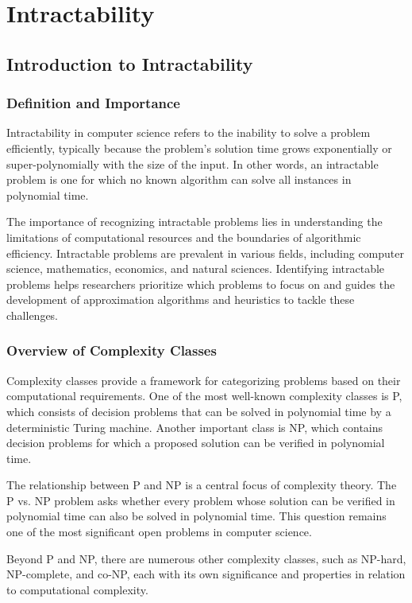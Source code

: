\documentclass[12pt]{book} %
\begin{document}
\chapter{Intractability}

\section{Introduction to Intractability}

\subsection{Definition and Importance}
Intractability in computer science refers to the inability to solve a problem efficiently, typically because the problem's solution time grows exponentially or super-polynomially with the size of the input. In other words, an intractable problem is one for which no known algorithm can solve all instances in polynomial time.

The importance of recognizing intractable problems lies in understanding the limitations of computational resources and the boundaries of algorithmic efficiency. Intractable problems are prevalent in various fields, including computer science, mathematics, economics, and natural sciences. Identifying intractable problems helps researchers prioritize which problems to focus on and guides the development of approximation algorithms and heuristics to tackle these challenges.

\subsection{Overview of Complexity Classes}
Complexity classes provide a framework for categorizing problems based on their computational requirements. One of the most well-known complexity classes is P, which consists of decision problems that can be solved in polynomial time by a deterministic Turing machine. Another important class is NP, which contains decision problems for which a proposed solution can be verified in polynomial time.

The relationship between P and NP is a central focus of complexity theory. The P vs. NP problem asks whether every problem whose solution can be verified in polynomial time can also be solved in polynomial time. This question remains one of the most significant open problems in computer science.

Beyond P and NP, there are numerous other complexity classes, such as NP-hard, NP-complete, and co-NP, each with its own significance and properties in relation to computational complexity.
\end{document}
